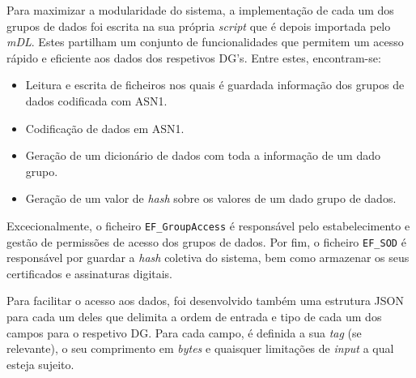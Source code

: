 
Para maximizar a modularidade do sistema, a implementação de cada um dos grupos de dados foi escrita na sua própria \textit{script} que é depois importada pelo \textit{mDL}. Estes partilham um conjunto de funcionalidades que permitem um acesso rápido e eficiente aos dados dos respetivos DG's. Entre estes, encontram-se:

\begin{itemize}
    \item Leitura e escrita de ficheiros nos quais é guardada informação dos grupos de dados codificada com ASN1.
    \item Codificação de dados em ASN1.
    \item Geração de um dicionário de dados com toda a informação de um dado grupo.
    \item Geração de um valor de \textit{hash} sobre os valores de um dado grupo de dados.
\end{itemize}

Excecionalmente, o ficheiro \texttt{EF\_GroupAccess} é responsável pelo estabelecimento e gestão de permissões de acesso dos grupos de dados. Por fim, o ficheiro \texttt{EF\_SOD} é responsável por guardar a \textit{hash} coletiva do sistema, bem como armazenar os seus certificados e assinaturas digitais.

Para facilitar o acesso aos dados, foi desenvolvido também uma estrutura JSON para cada um deles que delimita a ordem de entrada e tipo de cada um dos campos para o respetivo DG. Para cada campo, é definida a sua \textit{tag} (se relevante), o seu comprimento em \textit{bytes} e quaisquer limitações de \textit{input} a qual esteja sujeito.

